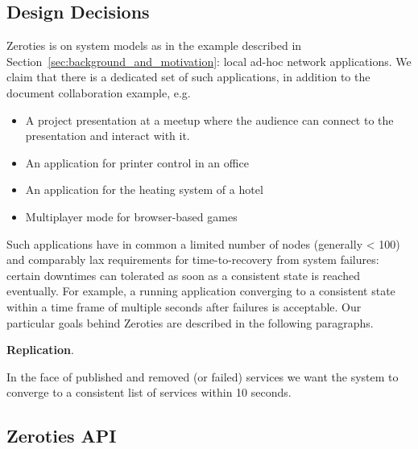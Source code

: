 \subsection{Design Decisions}
\label{sub:design}

Zeroties is on system models as in the example described in Section~\ref{sec:background_and_motivation}: local ad-hoc network applications. We claim that there is a dedicated set of such applications, in addition to the document collaboration example, e.g.
\begin{itemize}
\item A project presentation at a meetup where the audience can connect to the presentation and interact with it.
\item An application for printer control in an office
\item An application for the heating system of a hotel
\item Multiplayer mode for browser-based games
\end{itemize}

Such applications have in common a limited number of nodes (generally < 100) and comparably lax requirements for time-to-recovery from system failures: certain downtimes can tolerated as soon as a consistent state is reached eventually.
For example, a running application converging to a consistent state within a time frame of multiple seconds after failures is acceptable.
Our particular goals behind Zeroties are described in the following paragraphs.

\textbf{Replication}. 

In the face of published and removed (or failed) services we want the system to converge to a consistent list of services within 10 seconds.

\subsection{Zeroties API}
\label{sub:zeroties_api}